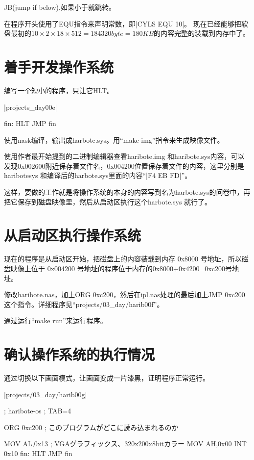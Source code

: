 JB(jump if below),如果小于就跳转。

在程序开头使用了EQU指令来声明常数，即|CYLS EQU 10|。
现在已经能够把软盘最初的$10\times 2\times 18\times512=184320 byte= 180KB $的内容完整的装载到内存中了。

\section{	着手开发操作系统	}
编写一个短小的程序，只让它HLT。

\dag |projects_day\harib00e|
\begin{code}[label=haribote.nas]
fin:
    HLT
    JMP fin
\end{code}

使用nask编译，输出成harbote.sys。用“make img”指令来生成映像文件。

使用作者最开始提到的二进制编辑器查看haribote.img 和haribote.sys内容，可以发现0x002600附近保存着文件名，0x004200位置保存着文件的内容，这里分别是haribotesys 和编译后的harbote.sys里面的内容“|F4 EB FD|”。

这样，要做的工作就是将操作系统的本身的内容写到名为harbote.sys的问卷中，再把它保存到磁盘映像里，然后从启动区执行这个harbote.sys 就行了。
\section{	从启动区执行操作系统	}
现在的程序是从启动区开始，把磁盘上的内容装载到内存 0x8000 号地址，所以磁盘映像上位于 0x004200 号地址的程序位于内存的0x8000+0x4200=0xc200号地址。

修改haribote.nas，加上ORG 0xc200，然后在ipl.nas处理的最后加上JMP 0xc200这个指令。详细程序见“projects/03\_day/harib00f”。

通过运行“make run”来运行程序。
\section{	确认操作系统的执行情况	}
通过切换以下画面模式，让画面变成一片漆黑，证明程序正常运行。

\dag |projects/03_day/harib00g|

\begin{code}
; haribote-os
; TAB=4

		ORG		0xc200			; このプログラムがどこに読み込まれるのか

		MOV		AL,0x13			; VGAグラフィックス、320x200x8bitカラー
		MOV		AH,0x00
		INT		0x10
fin:
		HLT
		JMP		fin
\end{code}

